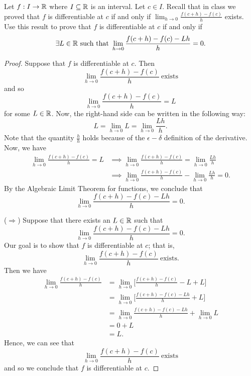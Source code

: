 \documentclass[a4paper]{article}
\begin{document}
\begin{problem}
   Let \( f: I \to \mathbb{R}  \) where \( I \subseteq  \mathbb{R}   \) is an interval. Let \( c \in I  \). Recall that in class we proved that \( f  \) is differentiable at \( c  \) if and only if \( \displaystyle \lim_{ h \to 0 } \frac{ f(c+h)  - f(c) }{ h }  \) exists. Use this result to prove that \( f  \) is differentiable at \( c  \) if and only if  
   \[  \exists L \in \R \ \text{such that} \ \lim_{ h \to 0 } \frac{ f(c+h) - f(c) - Lh }{ h } = 0. \]
\end{problem}
\begin{proof}
Suppose that \( f  \) is differentiable at \( c  \). Then
\[  \lim_{ h \to 0 }  \frac{ f(c+h) - f(c) }{ h  } \ \text{exists}    \]
and so 
\[  \lim_{ h \to 0 }  \frac{ f(c+h) - f(c) }{ h  } = L  \]
for some \( L \in \mathbb{R}  \). Now, the right-hand side can be written in the following way:
\[  L = \lim_{ h \to 0 }  L = \lim_{ h \to 0 }   \frac{ L h }{ h }.  \]
Note that the quantity \( \frac{ h }{ h }  \) holds because of the \( \epsilon-\delta \) definition of the derivative. Now, we have 
\begin{align*}
    \lim_{ h \to 0 }  \frac{ f(c+h) - f(c) }{ h   } = L  &\implies \lim_{ h \to 0 }  \frac{ f(c+h) - f(c) }{ h  } = \lim_{ h \to 0 } \frac{L h }{ h }  \\
                                                         &\implies \lim_{ h \to 0 }  \frac{ f(c+h) - f(c) }{ h }  - \lim_{ h \to 0 } \frac{ Lh  }{ h } = 0.
\end{align*}
By the Algebraic Limit Theorem for functions, we conclude that 
\[  \lim_{ h \to 0 } \frac{ f(c+h) - f(c) - Lh }{ h } = 0. \]

(\( \Longrightarrow \)) Suppose that there exists an \( L \in \mathbb{R}  \) such that 
\[  \lim_{ h \to 0 } \frac{ f(c+h) - f(c) - Lh }{ h  } = 0.  \]
Our goal is to show that \( f  \) is differentiable at \( c  \); that is,  
\[  \lim_{ h \to 0 } \frac{ f(c+h) - f(c) }{ h }  \ \text{exists}.  \]
Then we have 
\begin{align*}
    \lim_{ h \to 0 }  \frac{ f(c+h) - f(c) }{ h } &= \lim_{ h \to 0} \Big[  \frac{ f(c+h) - f(c)  }{ h  }  - L + L \Big] \\
                                                &= \lim_{ h \to 0 } \Big[ \frac{ f(c+h) - f(c) - Lh }{ h }  +  L \Big] \\
                                                &= \lim_{ h \to 0 }  \frac{ f(c+h) - f(c) - Lh }{ h }  + \lim_{ h \to 0 }  L \tag{ALT for Functions} \\
                                                &= 0 + L \\
                                                &= L. 
\end{align*}
Hence, we can see that 
\[  \lim_{ h \to 0 }  \frac{ f(c+h)-  f(c) }{ h  } \ \text{exists} \]
and so we conclude that \( f  \) is differentiable at \( c  \).
\end{proof}
\end{document}
